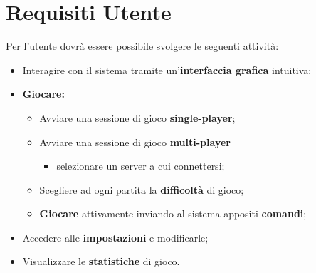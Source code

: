     
	\section{Requisiti Utente}
	Per l'utente dovrà essere possibile svolgere le seguenti attività:
	\begin{itemize}

    	    \item Interagire con il sistema tramite un'\textbf{interfaccia grafica} intuitiva;
    	    \item \textbf{Giocare:}
    	        \begin{itemize}
            	    \item Avviare una sessione di gioco \textbf{single-player};
            	    \item Avviare una sessione di gioco \textbf{multi-player}
            	        \begin{itemize}
            	            \item selezionare un server a cui connettersi;
            	        \end{itemize}
            	   \item Scegliere ad ogni partita la \textbf{difficoltà} di gioco;
            	   \item \textbf{Giocare} attivamente inviando al sistema appositi \textbf{comandi};
    	        \end{itemize}
    	   \item Accedere alle \textbf{impostazioni} e modificarle;
    	   \item Visualizzare le \textbf{statistiche} di gioco.
	\end{itemize}
	
